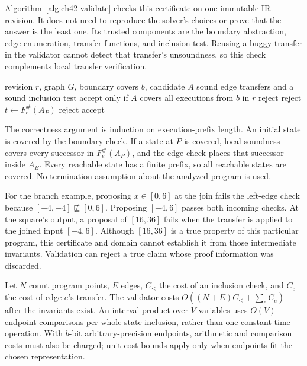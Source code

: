 Algorithm~\ref{alg:ch42-validate} checks this certificate on one immutable IR revision.
It does not need to reproduce the solver's choices or prove that the answer is the least one.
Its trusted components are the boundary abstraction, edge enumeration, transfer functions, and inclusion test.
Reusing a buggy transfer in the validator cannot detect that transfer's unsoundness, so this check complements local transfer verification.

\begin{algorithm}
\caption{Validate a proposed invariant on an immutable IR revision.}
\label{alg:ch42-validate}
\begin{pseudocode}
\Require revision $r$, graph $G$, boundary covers $b$, candidate $A$
\Require sound edge transfers and a sound inclusion test
\Ensure accept only if $A$ covers all executions from $b$ in $r$
  \State \Return reject
\EndIf
{}
    \State \Return reject
  \EndIf
\EndFor
{}
  \State $t\gets F_e^\#(A_P)$
    \State \Return reject
  \EndIf
\EndFor
\State \Return accept
\end{pseudocode}
\end{algorithm}

The correctness argument is induction on execution-prefix length.
An initial state is covered by the boundary check.
If a state at $P$ is covered, local soundness covers every successor in $F_e^\#(A_P)$, and the edge check places that successor inside $A_B$.
Every reachable state has a finite prefix, so all reachable states are covered.
No termination assumption about the analyzed program is used.

For the branch example, proposing $x\in[0,6]$ at the join fails the left-edge check because $[-4,-4]\not\sqsubseteq[0,6]$.
Proposing $[-4,6]$ passes both incoming checks.
At the square's output, a proposal of $[16,36]$ fails when the transfer is applied to the joined input $[-4,6]$.
Although $[16,36]$ is a true property of this particular program, this certificate and domain cannot establish it from those intermediate invariants.
Validation can reject a true claim whose proof information was discarded.

Let $N$ count program points, $E$ edges, $C_{\leq}$ the cost of an inclusion check, and $C_e$ the cost of edge $e$'s transfer.
The validator costs $O((N+E)C_{\leq}+\sum_e C_e)$ after the invariants exist.
An interval product over $V$ variables uses $O(V)$ endpoint comparisons per whole-state inclusion, rather than one constant-time operation.
With $b$-bit arbitrary-precision endpoints, arithmetic and comparison costs must also be charged; unit-cost bounds apply only when endpoints fit the chosen representation.

